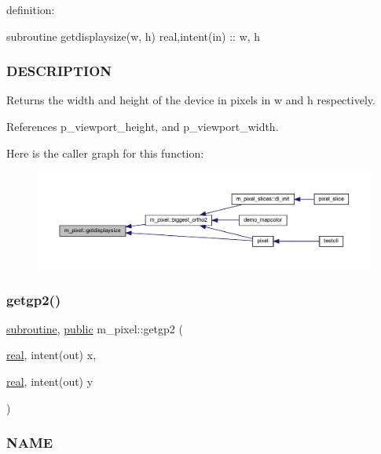 definition\+:

subroutine getdisplaysize(w, h) real,intent(in) \+:\+: w, h

\subsubsection*{D\+E\+S\+C\+R\+I\+P\+T\+I\+ON}

Returns the width and height of the device in pixels in w and h respectively. 

References p\+\_\+viewport\+\_\+height, and p\+\_\+viewport\+\_\+width.

Here is the caller graph for this function\+:
\nopagebreak
\begin{figure}[H]
\begin{center}
\leavevmode
\includegraphics[width=350pt]{namespacem__pixel_acacbc4462423b9aa0f591cbe7aba4ec6_icgraph}
\end{center}
\end{figure}
\mbox{\label{namespacem__pixel_a626d769d3dae0c292e3ef1617ad43efb}} 
\subsubsection{\texorpdfstring{getgp2()}{getgp2()}}
{\footnotesize\ttfamily \hyperlink{M__stopwatch_83_8txt_acfbcff50169d691ff02d4a123ed70482}{subroutine}, \hyperlink{M__stopwatch_83_8txt_a2f74811300c361e53b430611a7d1769f}{public} m\+\_\+pixel\+::getgp2 (\begin{DoxyParamCaption}\item[{\hyperlink{read__watch_83_8txt_abdb62bde002f38ef75f810d3a905a823}{real}, intent(out)}]{x,  }\item[{\hyperlink{read__watch_83_8txt_abdb62bde002f38ef75f810d3a905a823}{real}, intent(out)}]{y }\end{DoxyParamCaption})}



\subsubsection*{N\+A\+ME}


